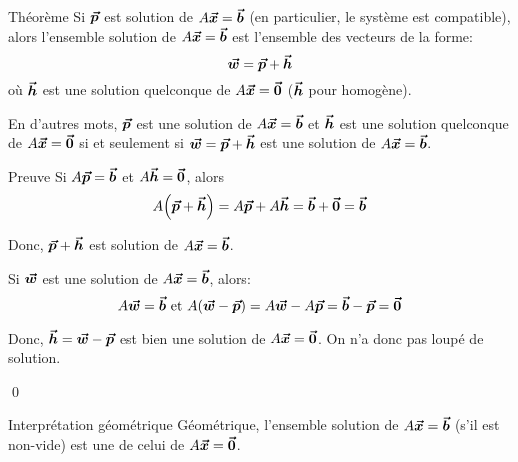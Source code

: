 \documentclass{article}
\begin{document}
\begin{parag}{Théorème}
    Si $\bm{\protect\vec{p}}$ est solution de $A \bm{\protect\vec{x}} = \bm{\protect\vec{b}}$ (en particulier, le système est compatible), alors l'ensemble solution de $A \bm{\protect\vec{x}} = \bm{\protect\vec{b}}$ est l'ensemble des vecteurs de la forme: 
    \[\bm{\protect\vec{w}} = \bm{\protect\vec{p}} + \bm{\protect\vec{h}}\]
    où $\bm{\protect\vec{h}}$ est une solution quelconque de $A \bm{\protect\vec{x}} = \bm{\protect\vec{0}}$ ($\bm{\protect\vec{h}}$ pour homogène).

    En d'autres mots, $\bm{\protect\vec{p}}$ est une solution de $A \bm{\protect\vec{x}} = \bm{\protect\vec{b}}$ et $\bm{\protect\vec{h}}$ est une solution quelconque de $A \bm{\protect\vec{x}} = \bm{\protect\vec{0}}$ si et seulement si $\bm{\protect\vec{w}} = \bm{\protect\vec{p}} + \bm{\protect\vec{h}}$ est une solution de $A \bm{\protect\vec{x}} = \bm{\protect\vec{b}}$. 
    
    \begin{subparag}{Preuve}
        Si $A \bm{\protect\vec{p}} = \bm{\protect\vec{b}}$ et $A \bm{\protect\vec{h}} = \bm{\protect\vec{0}}$, alors
       \[A\left(\bvec{p} + \bvec{h}\right) = A \bvec{p} + A \bvec{h} = \bvec{b} + \bvec{0} = \bvec{b}\]

       Donc, $\bm{\protect\vec{p}} + \bm{\protect\vec{h}}$ est solution de $A \bm{\protect\vec{x}} = \bm{\protect\vec{b}}$.

       \vspace{1em}
        Si $\bm{\protect\vec{w}}$ est une solution de $A \bm{\protect\vec{x}} = \bm{\protect\vec{b}}$, alors: 
       \[A \bvec{w} = \bvec{b} \text{ et } A\left(\bvec{w} - \bvec{p}\right) = A \bvec{w} - A \bvec{p} = \bvec{b} - \bvec{p} = \bvec{0}\]
       
       Donc, $\bm{\protect\vec{h}} = \bm{\protect\vec{w}} - \bm{\protect\vec{p}}$ est bien une solution de $A \bm{\protect\vec{x}} = \bm{\protect\vec{0}}$. On n'a donc pas loupé de solution.

       \qed
    \end{subparag}
\end{parag}

\begin{parag}{Interprétation géométrique}
    Géométrique, l'ensemble solution de $A \bm{\protect\vec{x}} = \bm{\protect\vec{b}}$ (s'il est non-vide) est une  de celui de $A \bm{\protect\vec{x}} = \bm{\protect\vec{0}}$.

\end{parag}
\end{document}
